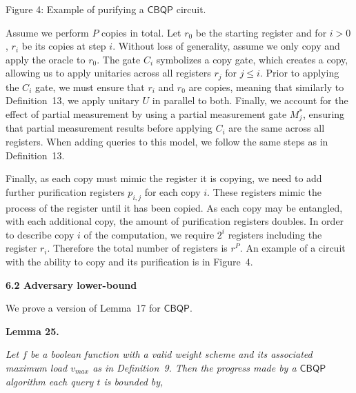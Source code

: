 Figure 4: Example of purifying a $\mathsf{CBQP}$ circuit.



Assume we perform $P$ copies in total. Let $r_{0}$ be the starting register and for $i>0$, $r_{i}$ be its copies at step $i$. Without loss of generality, assume we only copy and apply the oracle to $r_{0}$. The gate $C_{i}$ symbolizes a copy gate, which creates a copy, allowing us to apply unitaries across all registers $r_{j}$ for $j\leq i$. Prior to applying the $C_{i}$ gate, we must ensure that $r_{i}$ and $r_{0}$ are copies, meaning that similarly to Definition 13, we apply unitary $U$ in parallel to both. Finally, we account for the effect of partial measurement by using a partial measurement gate $M^{*}_{j}$, ensuring that partial measurement results before applying $C_{i}$ are the same across all registers. When adding queries to this model, we follow the same steps as in Definition 13.\par




Finally, as each copy must mimic the register it is copying, we need to add further purification registers $p_{i,j}$ for each copy $i$. These registers mimic the process of the register until it has been copied. As each copy may be entangled, with each additional copy, the amount of purification registers doubles. In order to describe copy $i$ of the computation, we require $2^{i}$ registers including the register $r_{i}$. Therefore the total number of registers is $r^{P}$. An example of a circuit with the ability to copy and its purification is in Figure 4.\par





\par\medskip\noindent\textbf{
6.2 Adversary lower-bound}\par




We prove a version of Lemma 17 for $\mathsf{CBQP}$.\par





\par\medskip\noindent\textbf{
\textbf{Lemma 25}\textbf{.}
}\par



\emph{Let $f$ be a boolean function with a valid weight scheme and its associated maximum load $v_{max}$ as in Definition 9. Then the progress made by a $\mathsf{CBQP}$ algorithm each query $t$ is bounded by,}\par


